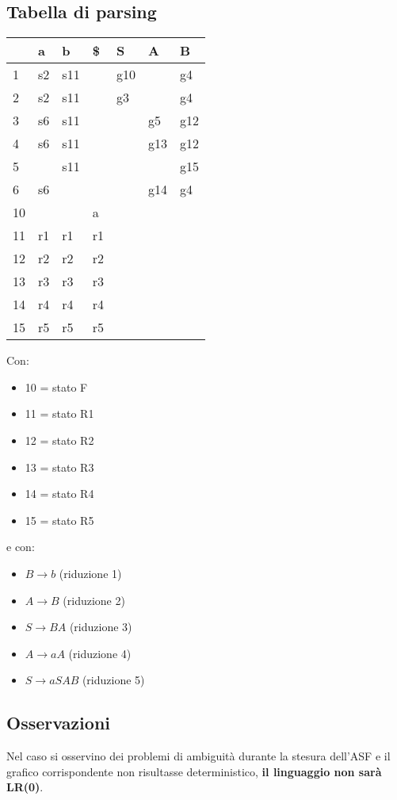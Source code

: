 \documentclass[a4paper, fleqn]{report}
\begin{document}
\subsection{Tabella di parsing}
\begin{tabular}{|l|l| l| l |l |l |l|}
\hline
& a & b & \$ & S & A & B \\
\hline
1 & s2 & s11 & & g10 & & g4 \\
\hline
2 & s2 & s11 & & g3 & & g4 \\
\hline
3 & s6 & s11 & & & g5 & g12 \\
\hline
4 & s6 & s11 & & & g13 & g12 \\
\hline
5 & & s11 & & & & g15 \\
\hline
6 & s6 & & & & g14 & g4 \\
\hline
10 &  & & a & & & \\
\hline
11 & r1 & r1 & r1 & & & \\
\hline
12 & r2 & r2 & r2 & & & \\
\hline
13 & r3 & r3 & r3 & & & \\
\hline
14 & r4 & r4 & r4 & & & \\
\hline
15 & r5 & r5 & r5 & & & \\
\hline
\end{tabular}\newline\newline
Con:
\begin{itemize}
\item 10 = stato F
\item 11 = stato R1
\item 12 = stato R2
\item 13 = stato R3
\item 14 = stato R4
\item 15 = stato R5
\end{itemize}
e con:
\begin{itemize}
\item \(B \rightarrow b\) (riduzione 1)
\item \(A \rightarrow B\) (riduzione 2)
\item \(S \rightarrow BA\) (riduzione 3)
\item \(A \rightarrow aA\) (riduzione 4)
\item \(S \rightarrow aSAB\) (riduzione 5)
\end{itemize}

\subsection{Osservazioni}
Nel caso si osservino dei problemi di ambiguità durante la stesura dell'ASF e il grafico corrispondente non risultasse deterministico, \textbf{il linguaggio non sarà LR(0)}.
\end{document}
